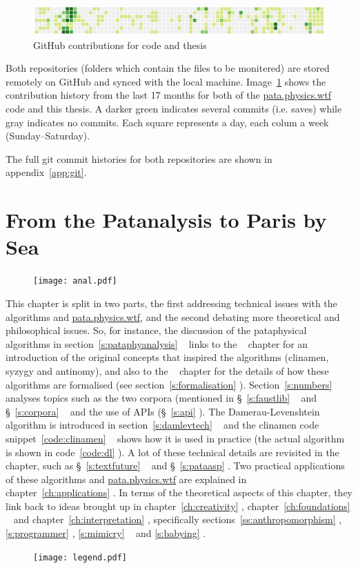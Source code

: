 \begin{figure}[!htbp] %
  \centering
  \includegraphics[width=\linewidth]{images/github0}
\caption[GitHub contributions]{GitHub contributions for code and thesis}
\label{img:github}
\end{figure}

Both repositories (folders which contain the files to be monitered) are stored remotely on GitHub \autocite*{GitHub2016} and synced with the local machine. Image~\ref{img:github} shows the contribution history from the last 17 months for both of the \url{pata.physics.wtf} code and this thesis. A darker green indicates several commits (i.e. saves) while gray indicates no commits. Each square represents a day, each colum a week (Sunday--Saturday).

The full git commit histories for both repositories are shown in appendix~\ref{app:git}. 


\section{From the Patanalysis to Paris by Sea}

\begin{figure}[!htb]
\centering
  \texttt{[image: anal.pdf]}
\end{figure}

This chapter is split in two parts, the first addressing technical issues with the algorithms and \url{pata.physics.wtf}, and the second debating more theoretical and philosophical issues. So, for instance, the discussion of the pataphysical algorithms in section~\ref{s:pataphyanalysis} \anal~ links to the  \pata~ chapter for an introduction of the original concepts that inspired the algorithms (clinamen, syzygy and antinomy), and also to the  \imple~ chapter for the details of how these algorithms are formalised (see section~\ref{s:formalisation} \imple). Section~\ref{s:numbers} \anal~ analyses topics such as the two corpora (mentioned in §~\ref{s:faustlib} \inspi~ and §~\ref{s:corpora} \imple~ and the use of APIs (§~\ref{s:api} \imple). The Damerau-Levenshtein algorithm is introduced in section~\ref{s:damlevtech} \tech~ and the clinamen code snippet~\ref{code:clinamen} \imple~ shows how it is used in practice (the actual algorithm is shown in code~\ref{code:dl} \imple). A lot of these technical details are revisited in the  \aspi~ chapter, such as §~\ref{s:textfuture} \aspi~ and §~\ref{s:pataasp} \aspi. Two practical applications of these algorithms and \url{pata.physics.wtf} are explained in chapter~\ref{ch:applications} \appli. In terms of the theoretical aspects of this chapter, they link back to ideas brought up in chapter~\ref{ch:creativity} \creat, chapter~\ref{ch:foundations} \found~ and chapter~\ref{ch:interpretation} \inter, specifically sections~\ref{ss:anthropomorphism} \inter, \ref{s:programmer} \inter, \ref{s:mimicry} \inter~ and \ref{s:babying} \inter.

\begin{figure}[!htb]
\centering
  \texttt{[image: legend.pdf]}
\end{figure}

\stopcontents[chapters]

